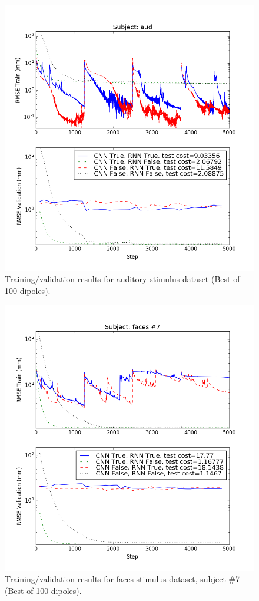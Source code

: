 \documentclass[journal]{IEEEtran}
\begin{document}
\begin{figure}[h!]
\centering
\includegraphics[width=7.25in]{aud100}
\caption{Training/validation results for auditory stimulus dataset (Best of 100 dipoles).}
\label{fig:aud100}
\end{figure}

\begin{figure}[h!]
\centering
\includegraphics[width=7.25in]{faces100}
\caption{Training/validation results for faces stimulus dataset, subject \#7 (Best of 100 dipoles).}
\label{fig:faces100}
\end{figure}
\end{document}
